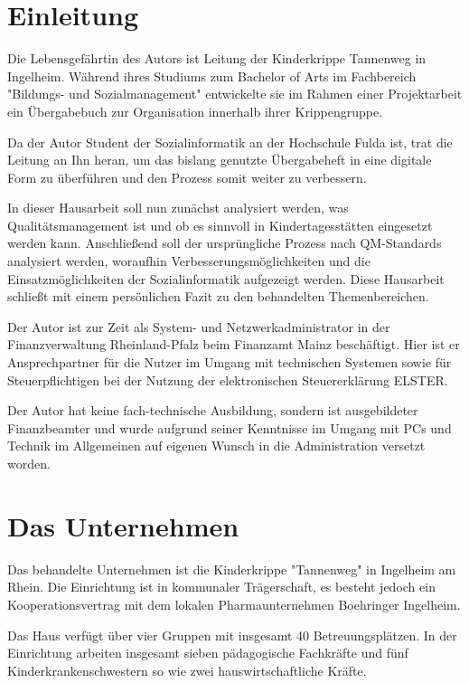 \section{Einleitung}\label{Einleitung}
Die Lebensgefährtin des Autors ist Leitung der Kinderkrippe Tannenweg in Ingelheim. Während ihres Studiums zum Bachelor of Arts im Fachbereich "{}Bildungs- und Sozialmanagement"{} entwickelte sie im Rahmen einer Projektarbeit ein Übergabebuch zur Organisation innerhalb ihrer Krippengruppe. 

Da der Autor Student der Sozialinformatik an der Hochschule Fulda ist, trat die Leitung an Ihn heran, um das bislang genutzte Übergabeheft in eine digitale Form zu überführen und den Prozess somit weiter zu verbessern.

In dieser Hausarbeit soll nun zunächst analysiert werden, was  Qualitätsmanagement ist und ob es sinnvoll in Kindertagesstätten eingesetzt werden kann. Anschließend soll der ursprüngliche Prozess nach QM-Standards analysiert werden, woraufhin Verbesserungsmöglichkeiten und die Einsatzmöglichkeiten der Sozialinformatik aufgezeigt werden. Diese Hausarbeit schließt mit einem persönlichen Fazit zu den behandelten Themenbereichen.

Der Autor ist zur Zeit als System- und Netzwerkadministrator in der Finanzverwaltung Rheinland-Pfalz beim Finanzamt Mainz beschäftigt. Hier ist er Ansprechpartner für die Nutzer im Umgang mit technischen Systemen sowie für Steuerpflichtigen bei der Nutzung der elektronischen Steuererklärung ELSTER. 

Der Autor hat keine fach-technische Ausbildung, sondern ist ausgebildeter Finanzbeamter und wurde aufgrund seiner Kenntnisse im Umgang mit PCs und Technik im Allgemeinen auf eigenen Wunsch in die Administration versetzt worden.

\newpage

\section{Das Unternehmen}

Das behandelte Unternehmen ist die Kinderkrippe "{}Tannenweg"{} in Ingelheim am Rhein. Die Einrichtung ist in kommunaler Trägerschaft, es besteht jedoch ein Kooperationsvertrag mit dem lokalen Pharmaunternehmen Boehringer Ingelheim.

Das Haus verfügt über vier Gruppen mit insgesamt 40 Betreuungsplätzen. In der Einrichtung arbeiten insgesamt sieben pädagogische Fachkräfte und fünf Kinderkrankenschwestern so wie zwei hauswirtschaftliche Kräfte.

